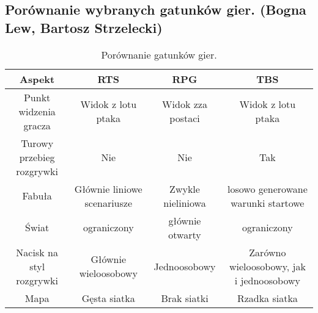 \subsection{Porównanie wybranych gatunków gier. (Bogna Lew, Bartosz Strzelecki)}

\begin{table}[h]
\caption{Porównanie gatunków gier.}
\begin{center}
\begin{tabular}{ |c||c|c|c| }
 \hline
 Aspekt & RTS & RPG & TBS \\
 \hline \hline
 Punkt widzenia gracza & Widok z lotu ptaka & Widok zza postaci & Widok z lotu ptaka \\
 \hline
 Turowy przebieg rozgrywki & Nie & Nie & Tak \\
 \hline
 Fabuła & Głównie liniowe scenariusze & Zwykle nieliniowa & losowo generowane warunki startowe \\
 \hline
 Świat & ograniczony & głównie otwarty & ograniczony \\
 \hline
 Nacisk na styl rozgrywki & Głównie wieloosobowy & Jednoosobowy & Zarówno wieloosobowy, jak i jednoosobowy \\
 \hline
 Mapa & Gęsta siatka & Brak siatki & Rzadka siatka \\
 \hline
\end{tabular}
\end{center}
\label{fig:teng} 
\end{table}
